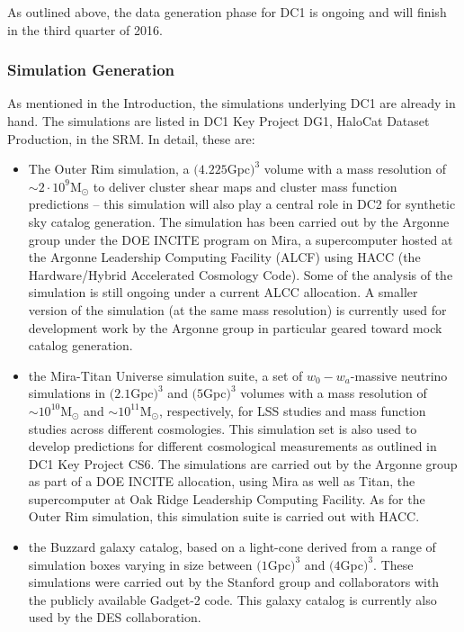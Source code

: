 As outlined above, the data generation phase for DC1 is ongoing and will finish in the third quarter of 2016. 

\subsubsection{Simulation Generation}
\label{sec:keysims:dc1:simgen}
As mentioned in the Introduction, the simulations underlying DC1 are already in hand. The simulations are listed in DC1 Key Project DG1, HaloCat Dataset Production, in the SRM. In detail, these are:
\begin{itemize}

\item The Outer Rim simulation, a $(4.225 $Gpc$)^3$ volume with a mass resolution of $\sim 2\cdot 10^9$M$_\odot$ to deliver cluster shear maps and cluster mass function predictions -- this simulation will also play a central role in DC2 for synthetic sky catalog generation. The simulation has been carried out by the Argonne group under the DOE INCITE program on Mira, a supercomputer hosted at the Argonne Leadership Computing Facility (ALCF) using HACC (the Hardware/Hybrid Accelerated Cosmology Code). Some of the analysis of the simulation is still ongoing under a current ALCC allocation. A smaller version of the simulation (at the same mass resolution) is currently used for development work by the Argonne group in particular geared toward mock catalog generation.

\item the Mira-Titan Universe simulation suite, a set of $w_0-w_a$-massive neutrino simulations in $(2.1$Gpc$)^3$ and $(5$Gpc$)^3$ volumes with a mass resolution of $\sim10^{10}$M$_\odot$ and $\sim 10^{11}$M$_\odot$, respectively, for LSS studies and mass function studies across different cosmologies. This simulation set is also used to develop predictions for different cosmological measurements as outlined in DC1 Key Project CS6. The simulations are carried out by the Argonne group as part of a DOE INCITE allocation, using Mira as well as Titan, the supercomputer at Oak Ridge Leadership Computing Facility. As for the Outer Rim simulation, this simulation suite is carried out with HACC.

\item the Buzzard galaxy catalog, based on a light-cone derived from a range of simulation boxes varying in size between $(1$Gpc$)^3$ and $(4$Gpc$)^3$. These simulations were carried out by the Stanford group and collaborators with the publicly available Gadget-2 code. This galaxy catalog is currently also used by the DES collaboration.

\end{itemize}

